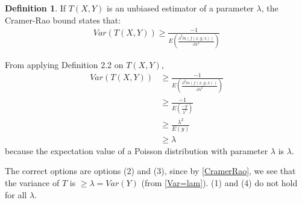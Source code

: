 \documentclass[twocolumn]{article}
\providecommand{\brak}[1]{\ensuremath{\left(#1\right)}}
\theoremstyle{remark}
\theoremstyle{definition}
\newtheorem{definition}{Definition}[section]
\numberwithin{equation}{subsection}
\begin{document}
\begin{definition}
If $T(X, Y)$ is an unbiased estimator of a parameter $\lambda$, the Cramer-Rao bound states that:
\begin{align}
    Var\brak{T\brak{X,Y}}\geq \frac{-1}{E\brak{\frac{\partial^2 ln(f(x,y;\lambda))}{\partial\lambda^2}}}
\end{align}
\end{definition}

From applying Definition 2.2 on $T(X,Y)$,
\begin{align}
    Var(T(X, Y))&\geq \frac{-1}{E\brak{\frac{\partial^2 ln(f(x,y;\lambda))}{\partial\lambda^2}}}\\
    &\geq\frac{-1}{E\brak{\frac{-y}{\lambda^2}}}\\
    &\geq\frac{\lambda^2}{E\brak{y}}\\
    &\geq \lambda \label{CramerRao}
\end{align}
because the expectation value of a Poisson distribution with parameter $\lambda$ is $\lambda$.

The correct options are options (2) and (3), since by \eqref{CramerRao}, we see that the variance of $T$ is $\geq \lambda=Var(Y)$ (from \eqref{Var=lam}). (1) and (4) do not hold for all $\lambda$.
\end{document}
